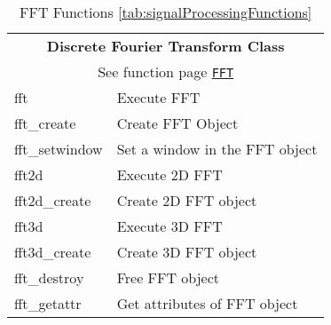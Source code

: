 \begin{table}[H]
\caption{FFT Functions \ref{tab:signalProcessingFunctions}}
\label{tab:fftFunctions}
\begin{center}
\begin{tabular}{|l|l|}
\multicolumn{2}{c}{\rmfamily \bfseries Discrete Fourier Transform Class}\\
\multicolumn{2}{c}{See function page \hyperlink{fftFunc}{\texttt{FFT}}} \\ \hline
fft & Execute FFT\\
fft\_create &Create FFT Object\\
fft\_setwindow &Set a window in the FFT object\\
fft2d & Execute 2D FFT\\
fft2d\_create & Create 2D FFT object\\
fft3d & Execute 3D FFT\\ 
fft3d\_create & Create 3D FFT object\\
fft\_destroy & Free FFT object\\
fft\_getattr & Get attributes of FFT object\\
\hline\end{tabular}
\end{center}
\label{default}
\end{table}%
